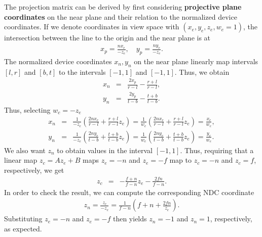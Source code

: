 \documentclass [12pt, a4paper] {article}
\begin{document}
The projection matrix can be derived by first considering \textbf{projective plane coordinates}
on the near plane and their relation to the normalized device coordinates. If we denote 
coordinates in view space with $(x_e, y_e, z_e, w_e=1)$, the intersection between the line 
to the origin and the near plane is at 
\begin {eqnarray}
    x_p = \frac{nx_e}{-z_e}, \quad 
    y_p = \frac{ny_e}{-z_e}.
\end {eqnarray}
The normalized device coordinates $x_n, y_n$ on the near plane linearly map 
intervals $[l, r]$ and $[b, t]$ to the intervals $[-1, 1]$ and $[-1, 1]$.
Thus, we obtain 
\begin {eqnarray}
    x_n 
    &=&
    \frac{2x_p}{r - l} - \frac{r + l}{r - l},
    \\
    y_n 
    &=&
    \frac{2y_p}{t - b} - \frac{t + b}{t - b}.
\end {eqnarray}
Thus, selecting $w_c=-z_e$
\begin {eqnarray}
    x_n 
    &=& 
    \frac{1}{-z_e}\left(
        \frac{2nx_e}{r-l} + \frac{r+l}{r-l}z_e
    \right)
    =
    \frac{1}{w_e}\left(
        \frac{2nx_e}{r-l} + \frac{r+l}{r-l}z_e
    \right)
    =
    \frac{x_c}{w_e},
    \\
    y_n 
    &=& 
    \frac{1}{-z_e}\left(
        \frac{2ny_e}{t-b} + \frac{t+b}{t-b}z_e
    \right)
    =
    \frac{1}{w_e}\left(
        \frac{2ny_e}{t-b} + \frac{t+b}{t-b}z_e
    \right)
    =
    \frac{y_c}{w_e}.
\end {eqnarray}
We also want $z_n$ to obtain values in the interval $[-1, 1]$. Thus, requiring that 
a linear map $z_c = Az_e + B$ maps
$z_e = -n$ and $z_e = -f$ map to $z_c = -n$ and $z_c = f$, respectively, we get 
\begin {eqnarray}
    z_c 
    &=&
    -\frac{f+n}{f-n}z_e - \frac{2fn}{f-n}.
\end {eqnarray}
In order to check the result, we can compute the corresponding NDC coordinate
\begin {eqnarray}
    z_n 
    = 
    \frac{z_c}{-z_e}
    = 
    \frac{1}{f - n}\left(f + n + \frac{2fn}{z_e}\right).
\end {eqnarray}
Substituting $z_e = -n$ and $z_e = -f$ then yields $z_n=-1$ and $z_n=1$, respectively,
as expected.
\end{document}
